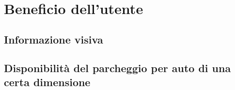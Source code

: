 \section{Beneficio dell'utente} 

\subsection{Informazione visiva}

\subsection{Disponibilità del parcheggio per auto di una certa dimensione}
